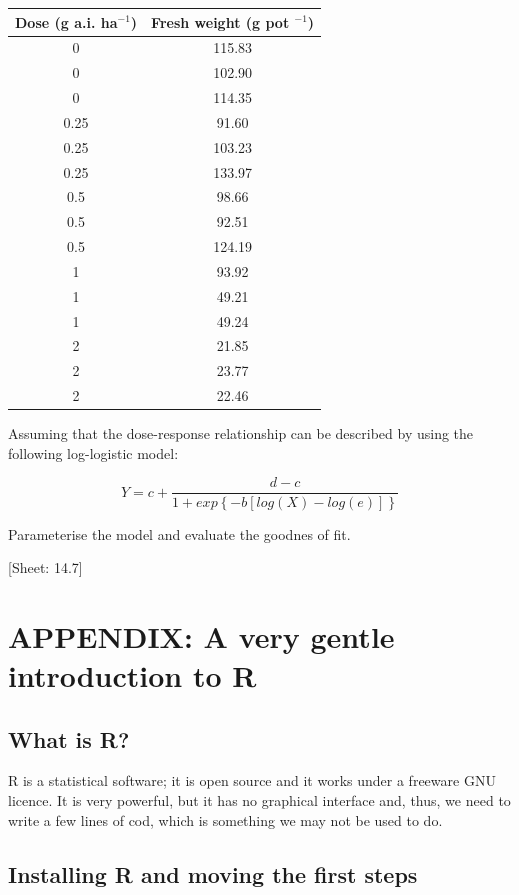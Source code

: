 \documentclass[a4paper,12pt,oneside]{book}
\begin{document}
\begin{longtable}[]{@{}cc@{}}
\toprule
Dose (g a.i. ha\(^{-1}\)) & Fresh weight (g pot \(^{-1}\)) \\
\midrule
\endhead
0 & 115.83 \\
0 & 102.90 \\
0 & 114.35 \\
0.25 & 91.60 \\
0.25 & 103.23 \\
0.25 & 133.97 \\
0.5 & 98.66 \\
0.5 & 92.51 \\
0.5 & 124.19 \\
1 & 93.92 \\
1 & 49.21 \\
1 & 49.24 \\
2 & 21.85 \\
2 & 23.77 \\
2 & 22.46 \\
\bottomrule
\end{longtable}

Assuming that the dose-response relationship can be described by using the following log-logistic model:

\[Y = c + \frac{d - c}{1 + exp \left\{ - b \left[ log (X) - log (e) \right] \right\}}\]

Parameterise the model and evaluate the goodnes of fit.

{[}Sheet: 14.7{]}

\hypertarget{appendix-a-very-gentle-introduction-to-r}{%
\chapter{APPENDIX: A very gentle introduction to R}\label{appendix-a-very-gentle-introduction-to-r}}

\hypertarget{what-is-r}{%
\section{What is R?}\label{what-is-r}}

R is a statistical software; it is open source and it works under a freeware GNU licence. It is very powerful, but it has no graphical interface and, thus, we need to write a few lines of cod, which is something we may not be used to do.

\hypertarget{installing-r-and-moving-the-first-steps}{%
\section{Installing R and moving the first steps}\label{installing-r-and-moving-the-first-steps}}
\end{document}
